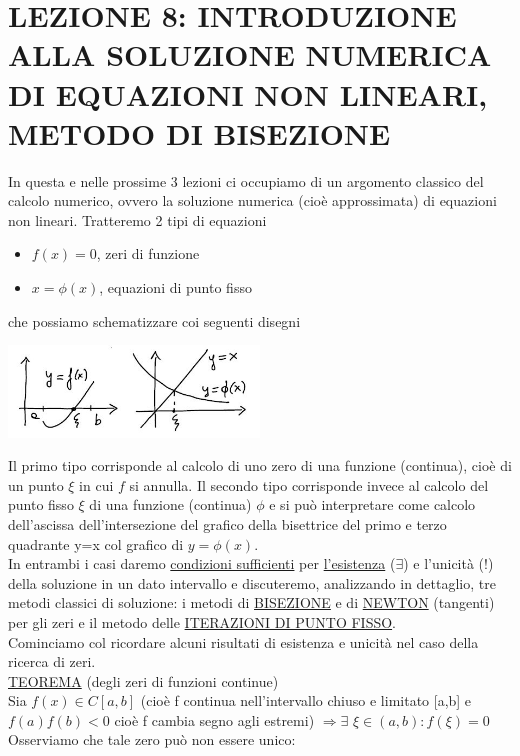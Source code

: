 \documentclass[12pt]{article}
\begin{document}
\section*{LEZIONE 8: INTRODUZIONE ALLA SOLUZIONE NUMERICA DI EQUAZIONI NON LINEARI, METODO DI BISEZIONE}
In questa e nelle prossime 3 lezioni ci occupiamo di un argomento classico del calcolo numerico, ovvero la soluzione numerica (cioè approssimata) di equazioni non lineari. Tratteremo 2 tipi di equazioni
\begin{itemize}
    \item $f(x)=0$, zeri di funzione
    \item $x=\phi(x)$, equazioni di punto fisso
\end{itemize}
che possiamo schematizzare coi seguenti disegni
\begin{center}
        \includegraphics[width=0.5\textwidth]{1.JPG}\par
\end{center}
Il primo tipo corrisponde al calcolo di uno zero di una funzione (continua), cioè di un punto $\xi$ in cui $f$ si annulla. Il secondo tipo corrisponde invece al calcolo del punto fisso $\xi$ di una funzione (continua) $\phi$ e si può interpretare come calcolo dell'ascissa dell'intersezione del grafico della bisettrice del primo e terzo quadrante y=x col grafico di $y=\phi(x)$.\\ In entrambi i casi daremo \underline{condizioni sufficienti} per \underline{l'esistenza} ($\exists$) e l'unicità (!) della soluzione in un dato intervallo e discuteremo, analizzando in dettaglio, tre metodi classici di soluzione: i metodi di \underline{BISEZIONE} e di \underline{NEWTON} (tangenti) per gli zeri e il metodo delle \underline{ITERAZIONI DI PUNTO FISSO}.\\
Cominciamo col ricordare alcuni risultati di esistenza e unicità nel caso della ricerca di zeri.\\ \underline{TEOREMA} (degli zeri di funzioni continue)\\
Sia $f(x)\in C[a,b]$ (cioè f continua nell'intervallo chiuso e limitato [a,b] e $f(a)f(b)<0$ cioè f cambia segno agli estremi) $\Rightarrow \exists$ $ \xi\in(a,b):f(\xi)=0$\\ Osserviamo che tale zero può non essere unico:
\end{document}
